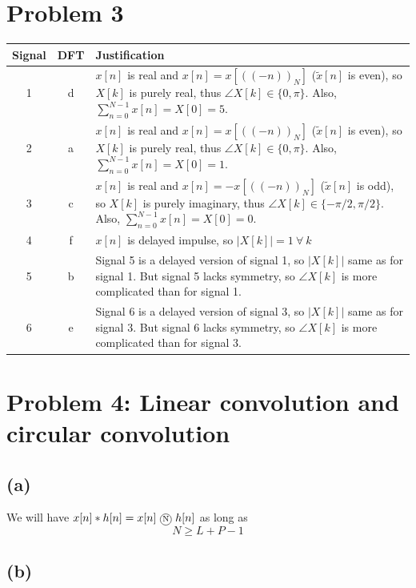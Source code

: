 \documentclass{article}
\begin{document}
\section{Problem 3}	
	\begin{center}
		\begin{tabular}{c|c|p{10cm}}
			Signal & DFT & Justification \\
			\hline
			1 & d & $x[n]$ is real and $x[n] = x[((-n))_N]$ ($\tilde{x}[n]$ is even), so $X[k]$ is purely real, thus $\angle X[k] \in \{0, \pi\}$. Also, $\sum_{n =0}^{N-1}x[n] = X[0] = 5$. \\
			\hline
			2 & a & $x[n]$ is real and $x[n] = x[((-n))_N]$ ($\tilde{x}[n]$ is even), so $X[k]$ is purely real, thus $\angle X[k] \in \{0, \pi\}$. Also, $\sum_{n =0}^{N-1}x[n] = X[0] = 1$. \\
			\hline
			3 & c & $x[n]$ is real and $x[n] = -x[((-n))_N]$ ($\tilde{x}[n]$ is odd), so $X[k]$ is purely imaginary, thus $\angle X[k] \in \{-\pi/2, \pi/2\}$. Also, $\sum_{n =0}^{N-1}x[n] = X[0] = 0$. \\
			\hline
			4 & f & $x[n]$ is delayed impulse, so $|X[k]| = 1~\forall~k$ \\
			\hline
			5 & b & Signal 5 is a delayed version of signal 1, so $|X[k]|$ same as for signal 1. But signal 5 lacks symmetry, so $\angle X[k]$ is more complicated than for signal 1.\\
			\hline
			6 & e & Signal 6 is a delayed version of signal 3, so $|X[k]|$ same as for signal 3. But signal 6 lacks symmetry, so $\angle X[k]$ is more complicated than for signal 3. \\
			\hline
		\end{tabular}
	\end{center}


\section{Problem 4: Linear convolution and circular convolution}	
\subsection{(a)}
We will have $x[n]\ast h[n] = x[n]~\encircle{N}~h[n]$ as long as
\begin{equation}
	N \geq L + P - 1
\end{equation}
\subsection{(b)}
\end{document}
